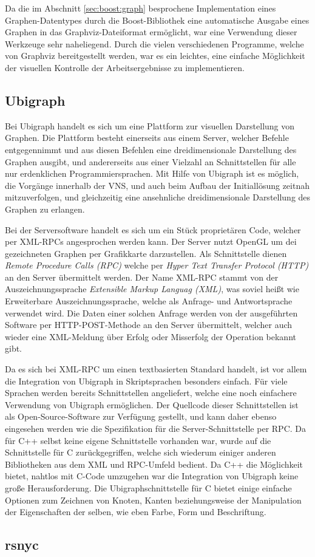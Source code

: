 Da die im Abschnitt \ref{sec:boost:graph} besprochene Implementation eines Graphen-Datentypes durch die Boost-Bibliothek eine automatische Ausgabe eines Graphen in das Graphviz-Dateiformat er\-möglicht, war 
eine Verwendung dieser Werkzeuge sehr naheliegend. Durch die vielen verschiedenen Programme, welche von Graphviz bereitgestellt werden, war es ein leichtes, eine einfache Möglichkeit der visuellen Kontrolle
der Arbeitsergebnisse zu implementieren. 


\subsection{Ubigraph}
\label{sec:ubigraph}
Bei Ubigraph handelt es sich um eine Plattform zur visuellen Darstellung von Graphen. Die Plattform besteht einerseits aus einem Server, welcher Befehle entgegennimmt und aus diesen Befehlen eine 
dreidimensionale Darstellung des Graphen ausgibt, und andererseits aus einer Vielzahl an Schnittstellen für alle nur erdenklichen Programmiersprachen. Mit Hilfe von Ubigraph ist es möglich, die
Vorgänge innerhalb der VNS, und auch beim Aufbau der Initiallösung zeitnah mitzuverfolgen, und gleichzeitig eine ansehnliche dreidimensionale Darstellung des Graphen zu erlangen.

Bei der Serversoftware handelt es sich um ein Stück proprietären Code, welcher per XML-RPCs angesprochen werden kann. Der Server nutzt OpenGL um dei gezeichneten Graphen per Grafikkarte darzustellen. Als
Schnittstelle dienen \textit{Remote Procedure Calls (RPC)} welche per \textit{Hyper Text Transfer Protocol (HTTP)} an den Server übermittelt werden. Der Name XML-RPC stammt von der Auszeichnungssprache
\textit{Extensible Markup Languag (XML)}, was soviel heißt wie Erweiterbare Auszeichnungssprache, welche als Anfrage- und Antwortsprache verwendet wird. Die Daten einer solchen Anfrage werden von der
ausgeführten Software per HTTP-POST-Methode an den Server übermittelt, welcher auch wieder eine XML-Meldung über Erfolg oder Misserfolg der Operation bekannt gibt. 

Da es sich bei XML-RPC um einen textbasierten Standard handelt, ist vor allem die Integration von Ubigraph in Skriptsprachen besonders einfach. Für viele Sprachen werden bereits Schnittstellen angeliefert,
welche eine noch einfachere Verwendung von Ubigraph ermöglichen. Der Quellcode dieser Schnittstellen ist als Open-Source-Software zur Verfügung gestellt, und kann daher ebenso eingesehen werden wie die
Spezifikation für die Server-Schnittstelle per RPC. Da für C++ selbst keine eigene Schnittstelle vorhanden war, wurde auf die Schnittstelle für C zurückgegriffen, welche sich wiederum einiger anderen Bibliotheken
aus dem XML und RPC-Umfeld bedient. Da C++ die Möglichkeit bietet, nahtlos mit C-Code umzugehen war die Integration von Ubigraph keine große Herausforderung. Die Ubigraphschnittstelle für C bietet einige
einfache Optionen zum Zeichnen von Knoten, Kanten beziehungsweise der Manipulation der Eigenschaften der selben, wie eben Farbe, Form und Beschriftung.


\subsection{rsnyc}
